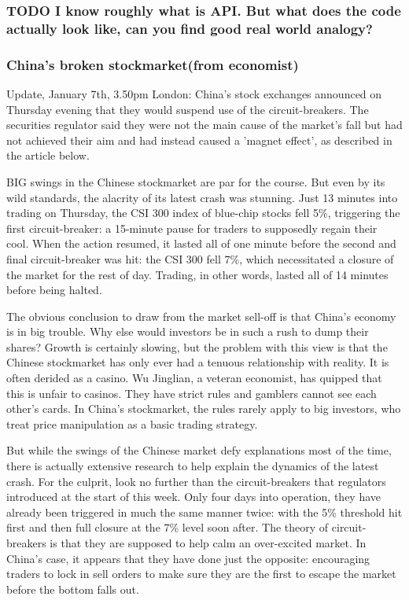 \documentclass[11pt]{article}
\begin{document}
\subsubsection*{{\bfseries\sffamily TODO} I know roughly what is \textbf{API}. But what does the code actually look like, can you find good real world analogy?}
\label{sec:orgheadline20}
\subsubsection*{China's broken stockmarket(from economist)}
\label{sec:orgheadline21}
Update, January 7th, 3.50pm London: China's stock exchanges announced on
Thursday evening that they would suspend use of the circuit-breakers. The
securities regulator said they were not the main cause of the market's fall but
had not achieved their aim and had instead caused a 'magnet effect', as
described in the article below.

BIG swings in the Chinese stockmarket are par for the course. But even by its
wild standards, the alacrity of its latest crash was stunning. Just 13 minutes
into trading on Thursday, the CSI 300 index of blue-chip stocks fell 5\%,
triggering the first circuit-breaker: a 15-minute pause for traders to
supposedly regain their cool. When the action resumed, it lasted all of one
minute before the second and final circuit-breaker was hit: the CSI 300 fell 7\%,
which necessitated a closure of the market for the rest of day. Trading, in
other words, lasted all of 14 minutes before being halted.

The obvious conclusion to draw from the market sell-off is that China’s economy
is in big trouble. Why else would investors be in such a rush to dump their
shares? Growth is certainly slowing, but the problem with this view is that the
Chinese stockmarket has only ever had a tenuous relationship with reality. It is
often derided as a casino. Wu Jinglian, a veteran economist, has quipped that
this is unfair to casinos. They have strict rules and gamblers cannot see each
other’s cards. In China's stockmarket, the rules rarely apply to big investors,
who treat price manipulation as a basic trading strategy.

But while the swings of the Chinese market defy explanations most of the time,
there is actually extensive research to help explain the dynamics of the latest
crash. For the culprit, look no further than the circuit-breakers that
regulators introduced at the start of this week. Only four days into operation,
they have already been triggered in much the same manner twice: with the 5\%
threshold hit first and then full closure at the 7\% level soon after. The theory
of circuit-breakers is that they are supposed to help calm an over-excited
market. In China’s case, it appears that they have done just the opposite:
encouraging traders to lock in sell orders to make sure they are the first to
escape the market before the bottom falls out.
\end{document}
